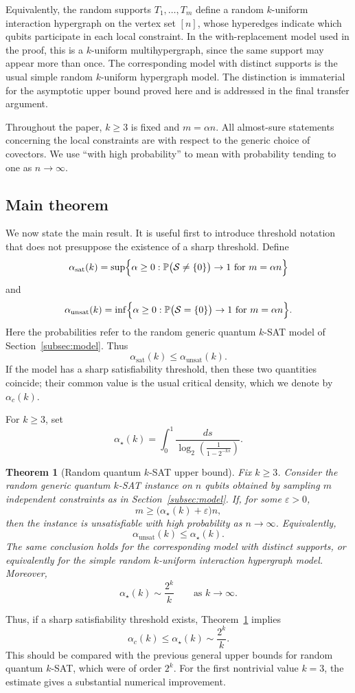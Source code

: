\documentclass[11pt]{article}
\newtheorem{theorem}{Theorem}
\begin{document}
Equivalently, the random supports \(T_1,\ldots,T_m\) define a random
\(k\)-uniform interaction hypergraph on the vertex set \([n]\), whose
hyperedges indicate which qubits participate in each local constraint.  In the
with-replacement model used in the proof, this is a \(k\)-uniform
multihypergraph, since the same support may appear more than once.  The
corresponding model with distinct supports is the usual simple random
\(k\)-uniform hypergraph model.  The distinction is immaterial for the
asymptotic upper bound proved here and is addressed in the final transfer
argument.

Throughout the paper, \(k\geq 3\) is fixed and \(m=\alpha n\).  All almost-sure
statements concerning the local constraints are with respect to the generic
choice of covectors.  We use ``with high probability'' to mean with probability
tending to one as \(n\to\infty\).

\subsection{Main theorem}
\label{subsec:main-theorem}

We now state the main result.  It is useful first to introduce threshold
notation that does not presuppose the existence of a sharp threshold.  Define
\[
\alpha_{\mathrm{sat}}(k)
=
\sup\Bigl\{
\alpha\geq 0:
\mathbb P\bigl(\mathcal S\neq\{0\}\bigr)\to 1
\text{ for } m=\alpha n
\Bigr\}
\]
and
\[
\alpha_{\mathrm{unsat}}(k)
=
\inf\Bigl\{
\alpha\geq 0:
\mathbb P\bigl(\mathcal S=\{0\}\bigr)\to 1
\text{ for } m=\alpha n
\Bigr\}.
\]
Here the probabilities refer to the random generic quantum
\(k\)-SAT model of Section~\ref{subsec:model}.  Thus
\[
\alpha_{\mathrm{sat}}(k)
\leq
\alpha_{\mathrm{unsat}}(k).
\]
If the model has a sharp satisfiability threshold, then these two quantities
coincide; their common value is the usual critical density, which we denote by
$
\alpha_c(k).
$

For \(k\geq 3\), set
\[
\alpha_\star(k)
=
\int_0^1
\frac{ds}{
	\log_2\left(\frac{1}{1-2^{-ks}}\right)
} .
\]

\begin{theorem}[Random quantum \(k\)-SAT upper bound]
	\label{thm:main}
	Fix \(k\geq 3\).  Consider the random generic quantum \(k\)-SAT
	instance on \(n\) qubits obtained by sampling \(m\) independent constraints as
	in Section~\ref{subsec:model}.  If, for some \(\varepsilon>0\),
	\[
	m\geq \bigl(\alpha_\star(k)+\varepsilon\bigr)n ,
	\]
	then the instance is unsatisfiable with high probability as \(n\to\infty\).
	Equivalently,
	\[
	\alpha_{\mathrm{unsat}}(k)
	\leq
	\alpha_\star(k).
	\]
	The same conclusion holds for the corresponding model with distinct supports,
	or equivalently for the simple random \(k\)-uniform interaction hypergraph
	model.  Moreover,
	\[
	\alpha_\star(k)
	\sim
	\frac{2^k}{k}
	\qquad\text{as } k\to\infty .
	\]
\end{theorem}
Thus, if a sharp satisfiability threshold exists, Theorem~\ref{thm:main}
implies
\[
\alpha_c(k)
\leq
\alpha_\star(k)
\sim
\frac{2^k}{k}.
\]
This should be compared with the previous general upper bounds for random quantum \(k\)-SAT, which were of order \(2^k\). 
For the first nontrivial value \(k=3\), the estimate gives a substantial
numerical improvement.
\end{document}
